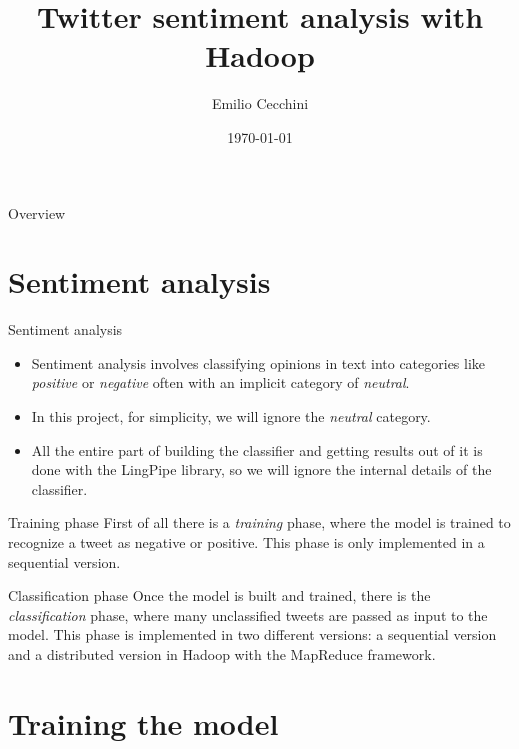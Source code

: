\documentclass{beamer}
\title{Twitter sentiment analysis with Hadoop}
\author{Emilio Cecchini}
\institute{
    Università degli Studi di Firenze \\
    \medskip
    \textit{emilio.cecchini@stud.unfi.it}
}
\date{\today}
\begin{document}
\maketitle


\begin{frame}{Overview}
\tableofcontents
\end{frame}


\section{Sentiment analysis}

\begin{frame}{Sentiment analysis}

\begin{itemize}
\item
Sentiment analysis involves classifying opinions in text into categories like \textit{positive} or \textit{negative} often with an implicit category of \textit{neutral}.
\item
In this project, for simplicity, we will ignore the \textit{neutral} category.
\item
All the entire part of building the classifier and getting results out of it is done with the LingPipe library, so we will ignore the internal details of the classifier.
\end{itemize}

\end{frame}


\begin{frame}{Training phase}
First of all there is a \textit{training} phase, where the model is trained to recognize a tweet as negative or positive. This phase is only implemented in a sequential version.
\end{frame}


\begin{frame}{Classification phase}
Once the model is built and trained, there is the \textit{classification} phase, where many unclassified tweets are passed as input to the model. This phase is implemented in two different versions: a sequential version and a distributed version in Hadoop with the MapReduce framework.
\end{frame}


\section{Training the model}
\end{document}
